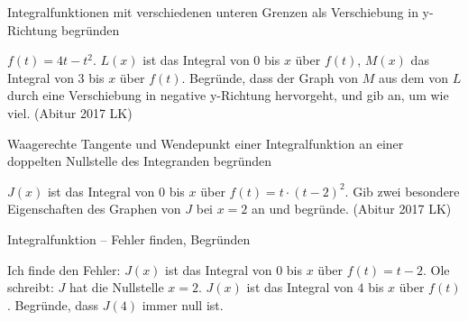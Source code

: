 \begin{aufgabe}{Integralfunktionen mit verschiedenen unteren Grenzen als Verschiebung in y-Richtung begründen}
\begin{teile}
\teil $f(t) = 4t - t^2$. $L(x)$ ist das Integral von $0$ bis $x$ über $f(t)$, $M(x)$ das Integral von $3$ bis $x$ über $f(t)$. Begründe, dass der Graph von $M$ aus dem von $L$ durch eine Verschiebung in negative y-Richtung hervorgeht, und gib an, um wie viel. \hfill (Abitur 2017 LK)
\end{teile}
\end{aufgabe}

\begin{aufgabe}{Waagerechte Tangente und Wendepunkt einer Integralfunktion an einer doppelten Nullstelle des Integranden begründen}
\begin{teile}
\teil $J(x)$ ist das Integral von $0$ bis $x$ über $f(t) = t \cdot (t - 2)^2$. Gib zwei besondere Eigenschaften des Graphen von $J$ bei $x = 2$ an und begründe. \hfill (Abitur 2017 LK)
\end{teile}
\end{aufgabe}

\begin{aufgabe}{Integralfunktion – Fehler finden, Begründen}
\begin{teile}
\teil Ich finde den Fehler: $J(x)$ ist das Integral von $0$ bis $x$ über $f(t) = t - 2$. Ole schreibt: $J$ hat die Nullstelle $x = 2$.
\teil $J(x)$ ist das Integral von $4$ bis $x$ über $f(t)$. Begründe, dass $J(4)$ immer null ist.
\end{teile}
\end{aufgabe}
